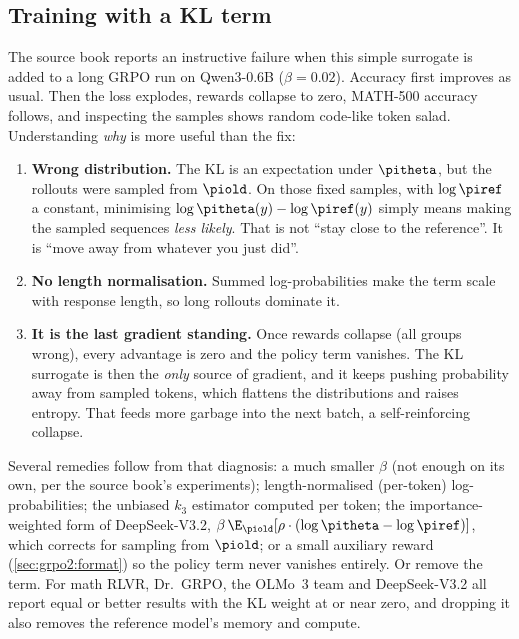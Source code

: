 \subsection{Training with a KL term}\label{sec:grpo2:kltrain}

The source book reports an instructive failure when this simple surrogate is added to a long
GRPO run on Qwen3-0.6B ($\beta=0.02$). Accuracy first improves as usual. Then the loss explodes,
rewards collapse to zero, MATH-500 accuracy follows, and inspecting the samples shows random
code-like token salad. Understanding \emph{why} is more useful than the fix:
\begin{enumerate}
\item \textbf{Wrong distribution.} The KL is an expectation under $\pitheta$, but the rollouts
were sampled from $\piold$. On those fixed samples, with $\log\piref$ a constant, minimising
$\log\pitheta(y)-\log\piref(y)$ simply means making the sampled sequences \emph{less likely}.
That is not ``stay close to the reference''. It is ``move away from whatever you just did''.
\item \textbf{No length normalisation.} Summed log-probabilities make the term scale with
response length, so long rollouts dominate it.
\item \textbf{It is the last gradient standing.} Once rewards collapse (all groups wrong),
every advantage is zero and the policy term vanishes. The KL surrogate is then the
\emph{only} source of gradient, and it keeps pushing probability away from sampled tokens,
which flattens the distributions and raises entropy. That feeds more garbage into the next
batch, a self-reinforcing collapse.
\end{enumerate}

Several remedies follow from that diagnosis: a much smaller $\beta$ (not enough on its own,
per the source book's experiments); length-normalised (per-token) log-probabilities; the
unbiased $k_3$ estimator computed per token; the importance-weighted form of DeepSeek-V3.2,
$\beta\,\E_{\piold}[\rho\cdot(\log\pitheta-\log\piref)]$, which corrects for sampling from
$\piold$; or a small auxiliary reward (\cref{sec:grpo2:format}) so the policy term never
vanishes entirely. Or remove the term. For math RLVR, Dr.~GRPO, the OLMo~3 team and
DeepSeek-V3.2 all report equal or better results with the KL weight at or near zero, and
dropping it also removes the reference model's memory and compute.

